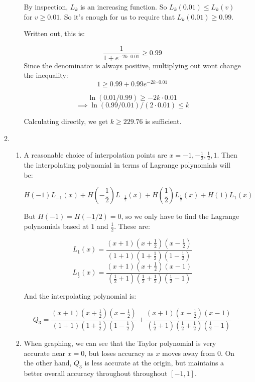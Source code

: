 \begin{enumerate}
\begin{enumerate}
\begin{enumerate}
			                  By inspection, $L_k$ is an increasing function. So $L_k(0.01)\leq L_k(v)$ for $v \geq 0.01$. So it's enough for us to require that $L_k(0.01)\geq 0.99$.

			                  Written out, this is:

			                  \[\frac{1}{1+e^{-2k\cdot 0.01}} \geq 0.99\]
			                  Since the denominator is always positive, multiplying out wont change the inequality:
			                  \[1 \geq 0.99 + 0.99 e^{-2k \cdot 0.01}\]

			                  \[\ln(0.01/0.99) \geq -2k\cdot 0.01\]
			                  \[\implies \ln(0.99/0.01)/(2\cdot 0.01)\leq k\]

			                  Calculating directly, we get $k\geq 229.76$ is sufficient.

		            \end{enumerate}
		      \item
		            \begin{enumerate}
			            \item A reasonable choice of interpolation points are $x = -1,-\frac{1}{2},\frac{1}{2},1$. Then the interpolating polynomial in terms of Lagrange polynomials will be:

			                  \[H(-1)L_{-1}(x) + H(-\frac{1}{2})L_{-\frac{1}{2}}(x) + H(\frac{1}{2})L_{\frac{1}{2}}(x) + H(1)L_1(x)\]

			                  But $H(-1) = H(-1/2) = 0$, so we only have to find the Lagrange polynomials based at $1$ and $\frac{1}{2}$. These are:

			                  \[L_1(x)=\frac{(x+1)(x+\frac{1}{2})(x-\frac{1}{2})}{(1+1)(1+\frac{1}{2})(1-\frac{1}{2})}\]
			                  \[L_{\frac{1}{2}}(x) = \frac{(x+1)(x+\frac{1}{2})(x-1)}{(\frac{1}{2}+1)(\frac{1}{2}+\frac{1}{2})(\frac{1}{2}-1)}\]

			                  And the interpolating polynomial is:

			                  \[Q_3 = \frac{(x+1)(x+\frac{1}{2})(x-\frac{1}{2})}{(1+1)(1+\frac{1}{2})(1-\frac{1}{2})} +\frac{(x+1)(x+\frac{1}{2})(x-1)}{(\frac{1}{2}+1)(\frac{1}{2}+\frac{1}{2})(\frac{1}{2}-1)}\]

			            \item When graphing, we can see that the Taylor polynomial is very accurate near $x=0$, but loses accuracy as $x$ moves away from $0$. On the other hand, $Q_3$ is less accurate at the origin, but maintains a better overall accuracy throughout throughout $[-1,1]$.


\end{enumerate}
\end{enumerate}
\end{enumerate}
